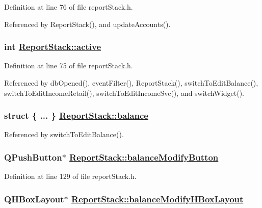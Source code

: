Definition at line 76 of file report\-Stack.h.

Referenced by Report\-Stack(), and update\-Accounts().\hypertarget{classReportStack_r6}{
\subsubsection[active]{\setlength{\rightskip}{0pt plus 5cm}int \hyperlink{classReportStack_r6}{Report\-Stack::active}}}
\label{classReportStack_r6}


Definition at line 75 of file report\-Stack.h.

Referenced by db\-Opened(), event\-Filter(), Report\-Stack(), switch\-To\-Edit\-Balance(), switch\-To\-Edit\-Income\-Retail(), switch\-To\-Edit\-Income\-Svc(), and switch\-Widget().\hypertarget{classReportStack_r99}{
\subsubsection[balance]{\setlength{\rightskip}{0pt plus 5cm}struct \{ ... \}   \hyperlink{classReportStack_r99}{Report\-Stack::balance}}}
\label{classReportStack_r99}




Referenced by switch\-To\-Edit\-Balance().\hypertarget{classReportStack_r54}{
\subsubsection[balanceModifyButton]{\setlength{\rightskip}{0pt plus 5cm}QPush\-Button$\ast$ \hyperlink{classReportStack_r54}{Report\-Stack::balance\-Modify\-Button}}}
\label{classReportStack_r54}


Definition at line 129 of file report\-Stack.h.\hypertarget{classReportStack_r53}{
\subsubsection[balanceModifyHBoxLayout]{\setlength{\rightskip}{0pt plus 5cm}QHBox\-Layout$\ast$ \hyperlink{classReportStack_r53}{Report\-Stack::balance\-Modify\-HBox\-Layout}}}
\label{classReportStack_r53}


